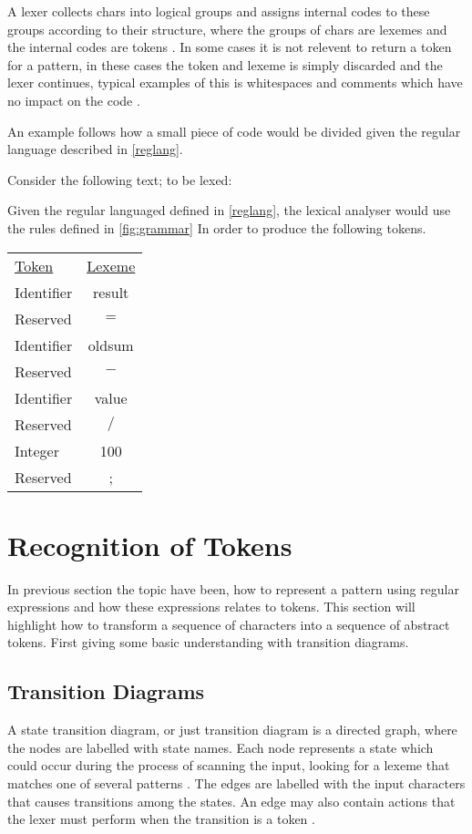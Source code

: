 A lexer collects chars into logical groups and assigns 
internal codes to these groups according to their structure, 
where the groups of chars are lexemes and the internal codes are tokens \cite{sebesta2012}.
In some cases it is not relevent to return a token for a pattern, in these
cases the token and lexeme is simply discarded and the lexer continues,
typical examples of this is whitespaces and comments which have no impact on
the code \cite{Aho2006}.

An example follows how a small piece of code would be divided given the regular
language described in \cref{reglang}.
\begin{example} \label{codeToToken}$ $\\
Consider the following text; to be lexed:

Given the regular languaged defined in \cref{reglang}, the lexical analyser would use the rules defined in \cref{fig:grammar}
In order to produce the following tokens.
\begin{center}
\begin{tabular}{l c}
\underline{Token} & \underline{Lexeme}\\
Identifier & result\\
Reserved & $=$\\
Identifier & oldsum\\
Reserved & $-$\\
Identifier & value\\
Reserved & $/$\\
Integer & 100\\
Reserved & ;
\end{tabular}
\end{center}
\end{example}

\section{Recognition of Tokens}
In previous section the topic have been, how to represent a pattern using 
regular expressions and how these expressions relates to tokens. This section 
will highlight how to transform a sequence of characters into a sequence of 
abstract tokens. First giving some basic understanding with transition diagrams.  

\subsection{Transition Diagrams}
A state transition diagram, or just transition diagram is a directed graph,
where the nodes are labelled with state names. Each node 
represents a state which could occur during the process of scanning the input, 
looking for a lexeme that matches one of several patterns \cite{Aho2006}. The 
edges are labelled with the input characters that causes transitions among 
the states. An edge may also contain actions that the lexer must perform when the
transition is a token \cite{sebesta2012}.

